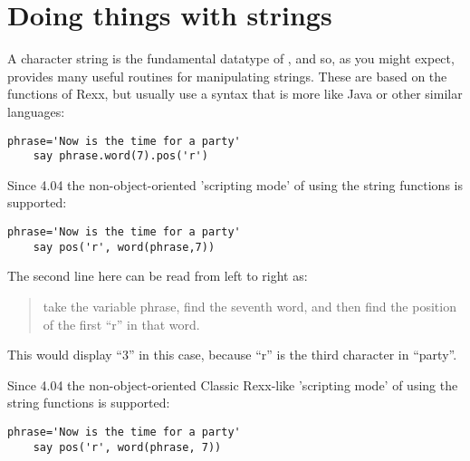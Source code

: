 \section{Doing things with strings}
A character string is the fundamental datatype of \nr{}, and so, as
you might expect, \nr{} provides many useful routines for
manipulating strings. These are based on the functions of Rexx, but
usually use a syntax that is more like Java or other similar languages:
\begin{lstlisting}[label=strings,caption=Strings]
    phrase='Now is the time for a party'
    say phrase.word(7).pos('r')
\end{lstlisting}
Since \nr{} 4.04 the non-object-oriented 'scripting mode' of using the string functions is supported:
\begin{lstlisting}[label=strings,caption=Strings]
    phrase='Now is the time for a party'
    say pos('r', word(phrase,7))
\end{lstlisting}

The second line here can be read from left to right as:
\begin{quote}take the variable phrase, find the seventh word, and then find the position of
the first “r” in that word.\end{quote}
This would display “3” in this case, because “r” is the third character in “party”.

Since \nr{} 4.04 the non-object-oriented Classic Rexx-like 'scripting mode' of using the string functions is supported:
\begin{lstlisting}[label=strings,caption=Strings]
    phrase='Now is the time for a party'
    say pos('r', word(phrase, 7))
\end{lstlisting}

